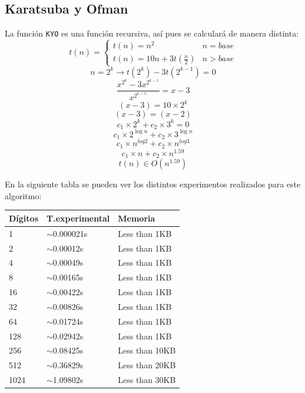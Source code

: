 \documentclass{article}
\begin{document}
\newpage
\subsection{Karatsuba y Ofman}
La función \texttt{KYO} es una función recursiva, así pues se calculará de manera distinta:
$$
	t(n) = \left\{
        \begin{array}{ll}
           	t(n)=n^2 & n=base \\
			t(n)=10n+3t(\frac{n}{2}) & n>base
        \end{array}
    \right.
$$
$$n = 2^k \rightarrow t(2^k)-3t(2^{k-1})=0$$
$$\frac{x^{2^k}-3x^{2^{k-1}}}{x^{2^{k-1}}} = x-3 $$
$$ (x-3)=10 \times 2^k $$
$$ (x-3)=(x-2) $$
$$ c_1\times 2^k+c_2 \times 3^k=0 $$
$$ c_1 \times 2^{\log n}+c_2 \times 3^{\log n} $$
$$ c_1 \times n^{log 2}+c_2 \times n^{log 3} $$
$$ c_1 \times n+c_2 \times n^{1.59} $$
$$ t(n)\in O(n^{1.59}) $$

\begin{center}
En la siguiente tabla se pueden ver los distintos experimentos realizados para este algoritmo: 
\end{center}
\label{kyo-table}
\begin{adjustbox}{width=0.5\textwidth,center=\textwidth}
\begin{tabular}{|l|l|l|}
\hline
{Dígitos} 					   & {T.experimental} 					   	& {Memoria} 					 \\ \hline
1                              & $\sim$0.000021s                        & Less than 1KB                  \\ \hline
2                              & $\sim$0.00012s                        	& Less than 1KB                  \\ \hline
4                              & $\sim$0.00049s                        	& Less than 1KB                  \\ \hline
8                              & $\sim$0.00165s                        	& Less than 1KB                  \\ \hline
16                             & $\sim$0.00422s                        	& Less than 1KB                  \\ \hline
32                             & $\sim$0.00826s                       	& Less than 1KB                  \\ \hline
64                             & $\sim$0.01724s                      	& Less than 1KB                  \\ \hline
128                            & $\sim$0.02942s                        	& Less than 1KB                  \\ \hline
256                            & $\sim$0.08425s                      	& Less than 10KB                 \\ \hline
512                            & $\sim$0.36829s                      	& Less than 20KB                 \\ \hline
1024                           & $\sim$1.09802s                        	& Less than 30KB                 \\ \hline
\end{tabular}
\end{adjustbox}
\end{document}
